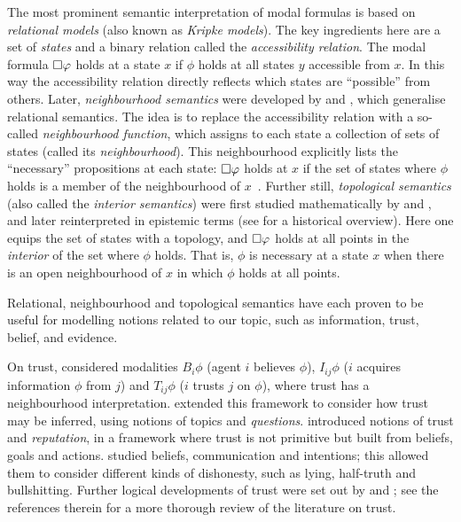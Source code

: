 {The most prominent semantic interpretation of modal formulas is based on
\emph{relational models} (also known as \emph{Kripke models}). The key
ingredients here are a set of \emph{states} and a binary relation called the
\emph{accessibility relation}. The modal formula $\Box\varphi$ holds at a
state $x$ if $\phi$ holds at all states $y$ accessible from $x$.\footnotemark{}
In this way the accessibility relation directly reflects which states are
``possible'' from others.
%
Later, \emph{neighbourhood semantics} were developed by \textcite{Scott1970}
and \textcite{montague1970universal}, which generalise relational semantics.
The idea is to replace the accessibility relation with a so-called
\emph{neighbourhood function}, which assigns to each state a collection of sets
of states (called its \emph{neighbourhood}). This neighbourhood explicitly
lists the ``necessary'' propositions at each state: $\Box\varphi$ holds at
$x$ if the set of states where $\phi$ holds is a member of the neighbourhood of
$x$~\cite{pacuit2017neighborhood}.
%
Further still, \emph{topological semantics} (also called the \emph{interior
semantics}) were first studied mathematically by \textcite{mckinsey41} and
\textcite{mckinseytarski44}, and later reinterpreted in epistemic terms (see
\textcite[Chapter 1]{ozgun_evidence} for a historical overview). Here one
equips the set of states with a topology, and $\Box\varphi$ holds at all
points in the \emph{interior} of the set where $\phi$ holds. That is, $\phi$ is
necessary at a state $x$ when there is an open neighbourhood of $x$ in which
$\phi$ holds at all points.


Relational, neighbourhood and topological semantics have each proven to be
useful for modelling notions related to our topic, such as information, trust,
belief, and evidence.

On trust, \textcite{Liau_2003} considered modalities $B_i\phi$ (agent $i$
believes $\phi$), $I_{ij}\phi$ ($i$ acquires information $\phi$ from $j$) and
$T_{ij}\phi$ ($i$ trusts $j$ on $\phi$), where trust has a neighbourhood
interpretation. \textcite{dastani2004inferring} extended this framework to
consider how trust may be inferred, using notions of topics and
\emph{questions}. \textcite{herzig2010logic} introduced notions of trust and
\emph{reputation}, in a framework where trust is not primitive but built from
beliefs, goals and actions. \textcite{sakama_formal_2014} studied beliefs,
communication and intentions; this allowed them to consider different kinds of
dishonesty, such as lying, half-truth and bullshitting. Further logical
developments of trust were set out by \textcite{rodenhauser2014matter} and
\textcite{tagliaferri2019logical}; see the references therein for a more
thorough review of the literature on trust.

}
